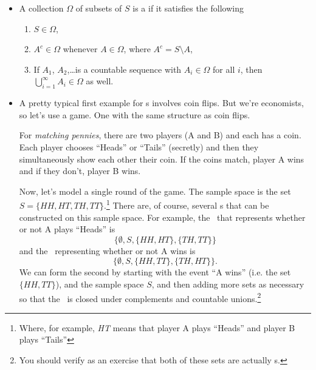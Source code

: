 \begin{itemize}[leftmargin=0pt]
\item %
  \begin{defn} A collection $\Omega$ of subsets of $S$ is a
    \emph{\sigmaalgebra} if it satisfies the following
    \begin{enumerate}
    \item $S \in \Omega$,
    \item $A^c \in \Omega$ whenever $A \in \Omega$, where $A^c = S \setminus A$,
    \item If $A_1$, $A_2$,\dots is a countable sequence with $A_i \in \Omega$ for
      all $i$, then $\bigcup_{i=1}^\infty A_i \in \Omega$ as well.
    \end{enumerate}
  \end{defn}

\item A pretty typical first example for \sigmaalgebra s involves coin
  flips.  But we're economists, so let's use a game.  One with the
  same structure as coin flips.
  \begin{ex}
    For \emph{matching pennies}, there are two players (A and B) and
    each has a coin.  Each player chooses ``Heads'' or ``Tails''
    (secretly) and then they simultaneously show each other their
    coin.  If the coins match, player A wins and if they don't, player
    B wins.

    Now, let's model a single round of the game.  The sample space is
    the set $S = \{HH, HT, TH, TT\}$.\footnote{Where, for example,
    \emph{HT} means that player A plays ``Heads'' and player B plays
    ``Tails''} There are, of course, several \sigmaalgebra s that can be
    constructed on this sample space.  For example, the \sigmaalgebra\ that
    represents whether or not A plays ``Heads'' is
    \begin{equation*}
      \{\emptyset, S, \{HH,HT\}, \{TH,TT\}\}
    \end{equation*}
    and the \sigmaalgebra\ representing whether or not A wins is
    \begin{equation*}
      \{\emptyset, S, \{HH,TT\}, \{TH,HT\}\}.
    \end{equation*}
    We can form the second \sigmaalgebra by starting with the event ``A
    wins'' (i.e. the set $\{HH, TT\}$), and the sample space $S$, and
    then adding more sets as necessary so that the \sigmaalgebra\ is closed
    under complements and countable unions.\footnote{You should verify
    as an exercise that both of these sets are actually \sigmaalgebra s.}
  \end{ex}


\end{itemize}
